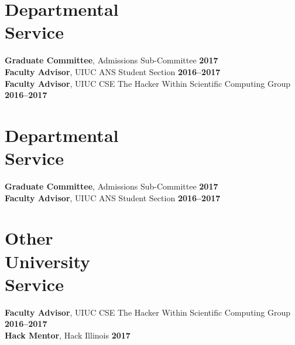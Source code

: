 \documentclass[margin,line]{resume}
\begin{document}
\begin{resume}
    \section{\mysidestyle Departmental\\Service}
		\textbf{Graduate Committee}, Admissions Sub-Committee \hfill \textbf{2017}\vspace{.5mm}\\%
		\textbf{Faculty Advisor}, UIUC ANS Student Section \hfill \textbf{2016--2017}\vspace{.5mm}\\%
		\textbf{Faculty Advisor}, UIUC CSE The Hacker Within Scientific Computing Group \hfill \textbf{2016--2017}\vspace{.5mm}\\%
    \section{\mysidestyle Departmental\\Service}
		\textbf{Graduate Committee}, Admissions Sub-Committee \hfill \textbf{2017}\vspace{.5mm}\\%
		\textbf{Faculty Advisor}, UIUC ANS Student Section \hfill \textbf{2016--2017}\vspace{.5mm}\\%
    \section{\mysidestyle Other\\University\\Service}
		\textbf{Faculty Advisor}, UIUC CSE The Hacker Within Scientific Computing Group \hfill \textbf{2016--2017}\vspace{.5mm}\\%
		\textbf{Hack Mentor}, Hack Illinois \hfill \textbf{2017}\vspace{.5mm}\\%




\end{resume}
\end{document}
